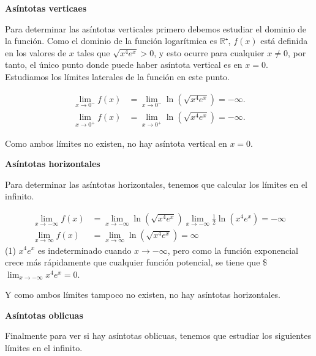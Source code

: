 \documentclass[
  spanish,
  a4paper,
]{scrreport}
\theoremstyle{definition}
\theoremstyle{remark}
\begin{document}
\begin{tcolorbox}[enhanced jigsaw, arc=.35mm, bottomrule=.15mm, bottomtitle=1mm, breakable, colback=white, colbacktitle=quarto-callout-tip-color!10!white, colframe=quarto-callout-tip-color-frame, coltitle=black, left=2mm, leftrule=.75mm, opacityback=0, opacitybacktitle=0.6, rightrule=.15mm, title=\textcolor{quarto-callout-tip-color}{\faLightbulb}\hspace{0.5em}{Solución}, titlerule=0mm, toprule=.15mm, toptitle=1mm]

\textbf{Asíntotas verticaes}

Para determinar las asíntotas verticales primero debemos estudiar el
dominio de la función. Como el dominio de la función logarítmica es
\(\mathbb{R}⁺\), \(f(x)\) está definida en los valores de \(x\) tales
que \(\sqrt{x^4e^x}>0\), y esto ocurre para cualquier \(x\neq 0\), por
tanto, el único punto donde puede haber asíntota vertical es en \(x=0\).
Estudiamos los límites laterales de la función en este punto.

\begin{align*}
\lim_{x\to 0^-} f(x)
&= \lim_{x\to 0^-} \ln(\sqrt{x^4e^x})
= -\infty.\\
\lim_{x\to 0^+} f(x)
&= \lim_{x\to 0^+} \ln(\sqrt{x^4e^x})
= -\infty.
\end{align*}

Como ambos límites no existen, no hay asíntota vertical en \(x=0\).

\textbf{Asíntotas horizontales}

Para determinar las asíntotas horizontales, tenemos que calcular los
límites en el infinito.

\begin{align*}
\lim_{x\to -\infty} f(x)
&= \lim_{x\to -\infty} \ln(\sqrt{x^4e^x}) 
\lim_{x\to -\infty} \frac{1}{2}\ln(x^4e^x) 
= -\infty \tag{1}\\
\lim_{x\to \infty} f(x)
&= \lim_{x\to \infty} \ln(\sqrt{x^4e^x}) 
= \infty
\end{align*} (1) \(x^4e^x\) es indeterminado cuando \(x\to-\infty\),
pero como la función exponencial crece más rápidamente que cualquier
función potencial, se tiene que \$\(\lim_{x\to-\infty} x^4e^x = 0\).

Y como ambos límites tampoco no existen, no hay asíntotas horizontales.

\textbf{Asíntotas oblicuas}

Finalmente para ver si hay asíntotas oblicuas, tenemos que estudiar los
siguientes límites en el infinito.


\end{tcolorbox}
\end{document}
